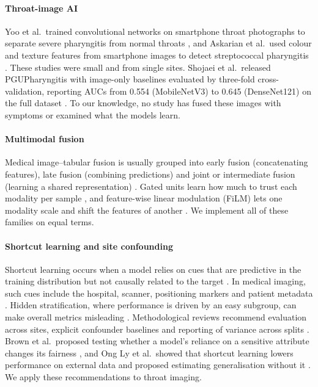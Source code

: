 \documentclass[preprint,12pt]{elsarticle}
\begin{document}
\paragraph{Throat-image AI} Yoo et al.\ trained convolutional networks on smartphone throat photographs to separate severe pharyngitis from normal throats \cite{yoo2020pharyngitis}, and Askarian et al.\ used colour and texture features from smartphone images to detect streptococcal pharyngitis \cite{askarian2019strep}. These studies were small and from single sites. Shojaei et al.\ released PGUPharyngitis with image-only baselines evaluated by three-fold cross-validation, reporting AUCs from 0.554 (MobileNetV3) to 0.645 (DenseNet121) on the full dataset \cite{shojaei2025pgu}. To our knowledge, no study has fused these images with symptoms or examined what the models learn.

\paragraph{Multimodal fusion} Medical image--tabular fusion is usually grouped into early fusion (concatenating features), late fusion (combining predictions) and joint or intermediate fusion (learning a shared representation) \cite{huang2020fusion}. Gated units learn how much to trust each modality per sample \cite{arevalo2017gmu}, and feature-wise linear modulation (FiLM) lets one modality scale and shift the features of another \cite{perez2018film}. We implement all of these families on equal terms.

\paragraph{Shortcut learning and site confounding} Shortcut learning occurs when a model relies on cues that are predictive in the training distribution but not causally related to the target \cite{geirhos2020shortcut}. In medical imaging, such cues include the hospital, scanner, positioning markers and patient metadata \cite{zech2018pneumonia,degrave2021covid,badgeley2019hip}. Hidden stratification, where performance is driven by an easy subgroup, can make overall metrics misleading \cite{oakdenrayner2020hidden}. Methodological reviews recommend evaluation across sites, explicit confounder baselines and reporting of variance across splits \cite{varoquaux2022failures}. Brown et al.\ proposed testing whether a model's reliance on a sensitive attribute changes its fairness \cite{brown2023shortcut}, and Ong Ly et al.\ showed that shortcut learning lowers performance on external data and proposed estimating generalisation without it \cite{ongly2024shortcut}. We apply these recommendations to throat imaging.
\end{document}
